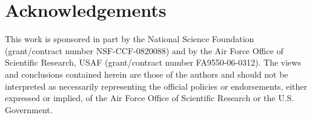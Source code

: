 \section{Acknowledgements}

This work is sponsored in part by the National Science Foundation (grant/contract number NSF-CCF-0820088)
and by the Air Force Office of Scientific Research, USAF (grant/contract number FA9550-06-0312).  
The views and conclusions contained herein are those of the authors and should not be 
interpreted as necessarily representing the official policies or endorsements, either 
expressed or implied, of the Air Force Office of Scientific Research or the U.S. Government.


